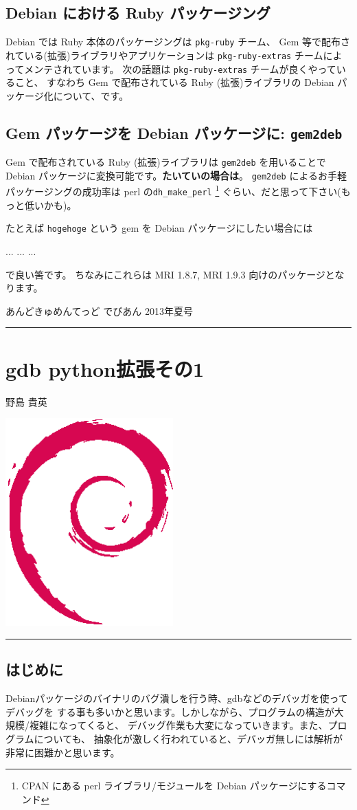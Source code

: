 \documentclass[mingoth,a4paper]{jsarticle}
\renewcommand{\dancersection}[2]{%
\newpage
あんどきゅめんてっど でびあん 2013年夏号
%
\vspace{0.1mm}\\
{\color{dancerdarkblue}\rule{\hsize}{2mm}}

%
%
\begin{minipage}[t]{0.6\hsize}
\color{dancerdarkblue}
\vspace{1cm}
\section{#1}
\hfill{}#2\\
\end{minipage}
\begin{minipage}[t]{0.4\hsize}
\vspace{-2cm}
\hfill{}\includegraphics[height=8cm]{image200502/openlogo-nd.eps}\\
\vspace{-5cm}
\end{minipage}
%
{\color{dancerlightblue}\rule{0.66\hsize}{2mm}}
%
\vspace{2cm}
}
\begin{document}
\subsection{Debian における Ruby パッケージング}

Debian では Ruby 本体のパッケージングは \texttt{pkg-ruby} チーム、
Gem 等で配布されている(拡張)ライブラリやアプリケーションは
\texttt{pkg-ruby-extras} チームによってメンテされています。
次の話題は
\texttt{pkg-ruby-extras} チームが良くやっていること、
すなわち Gem で配布されている Ruby (拡張)ライブラリの Debian パッケージ化について、です。

\subsection{Gem パッケージを Debian パッケージに: \texttt{gem2deb}}

Gem で配布されている Ruby (拡張)ライブラリは
\texttt{gem2deb} を用いることで Debian パッケージに変換可能です。\textbf{たいていの場合は}。
\texttt{gem2deb} によるお手軽パッケージングの成功率は perl の\texttt{dh\_make\_perl}
\footnote{%
  CPAN にある perl ライブラリ/モジュールを Debian パッケージにするコマンド
}
ぐらい、だと思って下さい(もっと低いかも)。

たとえば \texttt{hogehoge} という gem を Debian パッケージにしたい場合には
\begin{commandline}
...
...
...
\end{commandline}
で良い筈です。
ちなみにこれらは MRI 1.8.7, MRI 1.9.3 向けのパッケージとなります。

%

\dancersection{gdb python拡張その1}{野島 貴英}

\subsection{はじめに}

 Debianパッケージのバイナリのバグ潰しを行う時、gdbなどのデバッガを使ってデバッグを
する事も多いかと思います。しかしながら、プログラムの構造が大規模/複雑になってくると、
デバッグ作業も大変になっていきます。また、プログラムについても、
抽象化が激しく行われていると、デバッガ無しには解析が非常に困難かと思います。
\end{document}
